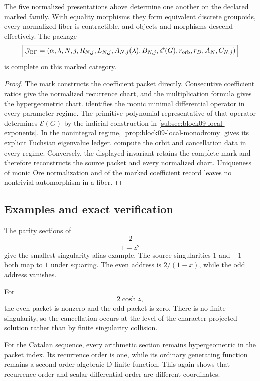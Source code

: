 \begin{theorem}
\label{thm:block09-marked-descent}
The five normalized presentations above determine one another on the declared marked family.  With equality morphisms they form equivalent discrete groupoids, every normalized fiber is contractible, and objects and morphisms descend effectively.  The package
\[
 \boxed{
 \mathcal J_{\rm BF}
 =
 \left(
 \alpha,\lambda,N,j,
 R_{N,j},L_{N,j},
 A_{N,j}(\lambda),B_{N,j},
 \mathscr E(G),
 r_{\rm orb},r_D,A_N,C_{N,j}
 \right)}
\]
is complete on this marked category.
\end{theorem}

\begin{proof}
The mark constructs the coefficient packet directly.  Consecutive coefficient ratios give the normalized recurrence chart, and the multiplication formula gives the hypergeometric chart.   identifies the monic minimal differential operator in every parameter regime.  The primitive polynomial representative of that operator determines \(\mathscr E(G)\) by the indicial construction in \cref{subsec:block09-local-exponents}.  In the nonintegral regime, \cref{prop:block09-local-monodromy} gives its explicit Fuchsian eigenvalue ledger.   compute the orbit and cancellation data in every regime.  Conversely, the displayed invariant retains the complete mark and therefore reconstructs the source packet and every normalized chart.  Uniqueness of monic Ore normalization and of the marked coefficient record leaves no nontrivial automorphism in a fiber.
\end{proof}

\subsection{Examples and exact verification}
\label{subsec:block09-verification}

The parity sections of
\[
 \frac{2}{1-z^2}
\]
give the smallest singularity-alias example.  The source singularities $1$ and $-1$ both map to $1$ under squaring.  The even address is $2/(1-x)$, while the odd address vanishes.

For
\[
 2\cosh z,
\]
the even packet is nonzero and the odd packet is zero.  There is no finite singularity, so the cancellation occurs at the level of the character-projected solution rather than by finite singularity collision.

For the Catalan sequence, every arithmetic section remains hypergeometric in the packet index.  Its recurrence order is one, while its ordinary generating function remains a second-order algebraic D-finite function.  This again shows that recurrence order and scalar differential order are different coordinates.

